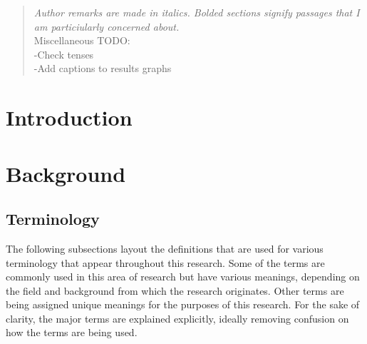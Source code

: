 \documentclass[11pt]{article}
\begin{document}
\pagebreak
\thispagestyle{empty}
\begin{abstract}
\emph{Author remarks are made in italics. Bolded sections signify passages that I am particiularly concerned about.}\\

Miscellaneous TODO:\\
	-Check tenses\\
	-Add captions to results graphs\\
\end{abstract}
\clearpage
{}
\tableofcontents
\listoffigures
\listoftables
\pagebreak

\section{Introduction}

\section{Background}
	\subsection{Terminology}
	The following subsections layout the definitions that are used for various terminology that appear throughout this research. Some of the terms are commonly used in this area of research but have various meanings, depending on the field and background from which the research originates. Other terms are being assigned unique meanings for the purposes of this research. For the sake of clarity, the major terms are explained explicitly, ideally removing confusion on how the terms are being used.
	
\end{document}

